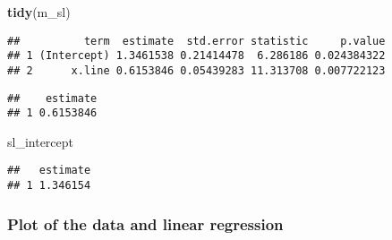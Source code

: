 \documentclass[]{book}
\newenvironment{Shaded}{\begin{snugshade}}{\end{snugshade}}
\newcommand{\KeywordTok}[1]{\textcolor[rgb]{0.13,0.29,0.53}{\textbf{#1}}}
\newcommand{\NormalTok}[1]{#1}
\newcommand{\OperatorTok}[1]{\textcolor[rgb]{0.81,0.36,0.00}{\textbf{#1}}}
\newcommand{\StringTok}[1]{\textcolor[rgb]{0.31,0.60,0.02}{#1}}
\theoremstyle{definition}
\theoremstyle{definition}
\theoremstyle{definition}
\theoremstyle{remark}
\begin{document}
\begin{Shaded}
\begin{Highlighting}[]
\KeywordTok{tidy}\NormalTok{(m_sl)}
\end{Highlighting}
\end{Shaded}

\begin{verbatim}
##          term  estimate  std.error statistic     p.value
## 1 (Intercept) 1.3461538 0.21414478  6.286186 0.024384322
## 2      x.line 0.6153846 0.05439283 11.313708 0.007722123
\end{verbatim}

\begin{Shaded}
\end{Shaded}

\begin{verbatim}
##    estimate
## 1 0.6153846
\end{verbatim}

\begin{Shaded}
\begin{Highlighting}[]
\NormalTok{sl_intercept}
\end{Highlighting}
\end{Shaded}

\begin{verbatim}
##   estimate
## 1 1.346154
\end{verbatim}

\hypertarget{plot-of-the-data-and-linear-regression}{%
\subsubsection{Plot of the data and linear
regression}\label{plot-of-the-data-and-linear-regression}}
\end{document}
